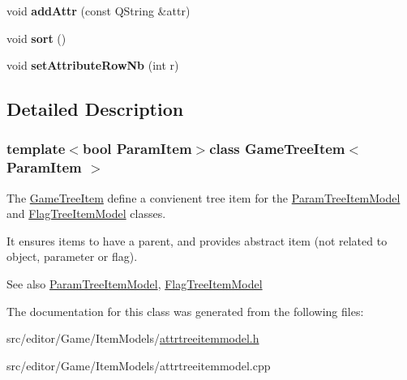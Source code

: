\begin{DoxyCompactItemize}
\item 
\hypertarget{class_game_tree_item_a52f6a8fe1ef6cb41944db7dc33e3c4ef}{void {\bfseries add\-Attr} (const \-Q\-String \&attr)}\label{class_game_tree_item_a52f6a8fe1ef6cb41944db7dc33e3c4ef}

\item 
\hypertarget{class_game_tree_item_ad380cc52e9af8a0b47f62a726bf266c6}{void {\bfseries sort} ()}\label{class_game_tree_item_ad380cc52e9af8a0b47f62a726bf266c6}

\item 
\hypertarget{class_game_tree_item_a803cc4eab83275877eb1ad6a21a8ea8a}{void {\bfseries set\-Attribute\-Row\-Nb} (int r)}\label{class_game_tree_item_a803cc4eab83275877eb1ad6a21a8ea8a}

\end{DoxyCompactItemize}


\subsection{\-Detailed \-Description}
\subsubsection*{template$<$bool \-Param\-Item$>$class Game\-Tree\-Item$<$ Param\-Item $>$}

\-The \hyperlink{class_game_tree_item}{\-Game\-Tree\-Item} define a convienent tree item for the \hyperlink{class_param_tree_item_model}{\-Param\-Tree\-Item\-Model} and \hyperlink{class_flag_tree_item_model}{\-Flag\-Tree\-Item\-Model} classes. 

\-It ensures items to have a parent, and provides abstract item (not related to object, parameter or flag).

\begin{DoxySeeAlso}{\-See also}
\hyperlink{class_param_tree_item_model}{\-Param\-Tree\-Item\-Model}, \hyperlink{class_flag_tree_item_model}{\-Flag\-Tree\-Item\-Model} 
\end{DoxySeeAlso}


\-The documentation for this class was generated from the following files\-:\begin{DoxyCompactItemize}
\item 
src/editor/\-Game/\-Item\-Models/\hyperlink{attrtreeitemmodel_8h}{attrtreeitemmodel.\-h}\item 
src/editor/\-Game/\-Item\-Models/attrtreeitemmodel.\-cpp\end{DoxyCompactItemize}
